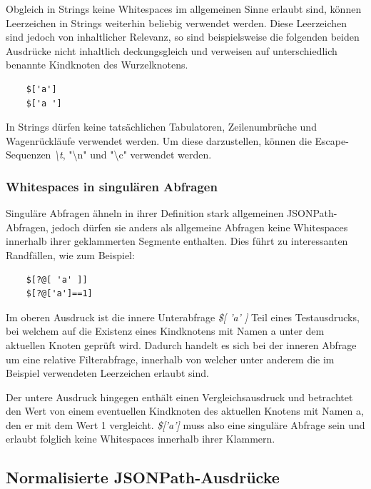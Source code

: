 \documentclass[oneside]{ausarbeitung}
\begin{document}
Obgleich in Strings keine Whitespaces im allgemeinen Sinne erlaubt sind, können Leerzeichen in Strings weiterhin beliebig verwendet werden. Diese Leerzeichen sind jedoch von inhaltlicher Relevanz, so sind beispielsweise die folgenden beiden Ausdrücke nicht inhaltlich deckungsgleich und verweisen auf unterschiedlich benannte Kindknoten des Wurzelknotens.
	
\begin{lstlisting}
	$['a']
	$['a ']
\end{lstlisting}
	
In Strings dürfen keine tatsächlichen Tabulatoren, Zeilenumbrüche und Wagenrückläufe verwendet werden. Um diese darzustellen, können die Escape-Sequenzen \textit{\textbackslash t}, "\textbackslash{}n" und "\textbackslash{}c" verwendet werden.
	
	
	
\subsubsection{Whitespaces in singulären Abfragen}
	
	
Singuläre Abfragen ähneln in ihrer Definition stark allgemeinen JSONPath-Abfragen, jedoch dürfen sie anders als allgemeine Abfragen keine Whitespaces innerhalb ihrer geklammerten Segmente enthalten.
Dies führt zu interessanten Randfällen, wie zum Beispiel:
	
\begin{lstlisting}
	$[?@[ 'a' ]]
	$[?@['a']==1]
\end{lstlisting}
	
Im oberen Ausdruck ist die innere Unterabfrage \textit{\$[ 'a' ]} Teil eines Testausdrucks, bei welchem auf die Existenz eines Kindknotens mit Namen a unter dem aktuellen Knoten geprüft wird. Dadurch handelt es sich bei der inneren Abfrage um eine relative Filterabfrage, innerhalb von welcher unter anderem die im Beispiel verwendeten Leerzeichen erlaubt sind. 
	
Der untere Ausdruck hingegen enthält einen Vergleichsausdruck und betrachtet den Wert von einem eventuellen Kindknoten des aktuellen Knotens mit Namen a, den er mit dem Wert 1 vergleicht. \textit{\$['a']} muss also eine singuläre Abfrage sein und erlaubt folglich keine Whitespaces innerhalb ihrer Klammern.
	
		
	
\subsection{Normalisierte JSONPath-Ausdrücke}
	
\end{document}
